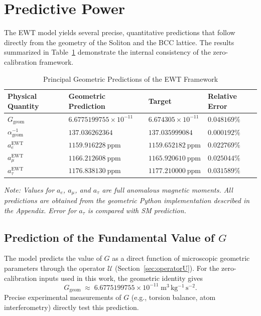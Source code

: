 \documentclass[10pt,a4paper]{article}
\begin{document}
\section{Predictive Power}
\label{sec:predictive_power}

The EWT model yields several precise, quantitative predictions that follow directly from the geometry of the Soliton and the BCC lattice. The results summarized in Table~\ref{tab:predictive_power_geom} demonstrate the internal consistency of the zero-calibration framework.

\begin{table}[ht]
	\centering
	\caption{Principal Geometric Predictions of the EWT Framework}
	\label{tab:predictive_power_geom}
	\begin{tabularx}{\textwidth}{lXXX}
		\toprule
		\textbf{Physical Quantity} & \textbf{Geometric Prediction} & \textbf{Target} & \textbf{Relative Error} \\
		\midrule
		$G_{\text{geom}}$ & $6.6775199755 \times 10^{-11}$ & $6.674305 \times 10^{-11}$ & $0.048169\%$ \\
		$\alpha_{\text{geom}}^{-1}$ & $137.036262364$ & $137.035999084$ & $0.000192\%$ \\
		\midrule
		$a_e^{\text{EWT}}$ & $1159.916228\ \text{ppm}$ & $1159.652182\ \text{ppm}$ & $0.022769\%$ \\
		$a_\mu^{\text{EWT}}$ & $1166.212608\ \text{ppm}$ & $1165.920610\ \text{ppm}$ & $0.025044\%$ \\
		$a_\tau^{\text{EWT}}$ & $1176.838130\ \text{ppm}$ & $1177.210000\ \text{ppm}$ & $0.031589\%$ \\
		\bottomrule
	\end{tabularx}
	\begin{flushleft}
		\small \textit{Note: Values for \(a_e\), \(a_\mu\), and \(a_\tau\) are full anomalous magnetic moments. All predictions are obtained from the geometric Python implementation described in the Appendix. Error for \(a_\tau\) is compared with SM prediction.}
	\end{flushleft}
\end{table}

\subsection{Prediction of the Fundamental Value of \(G\)}
\label{sec:g_predictions_pp}

The model predicts the value of \(G\) as a direct function of microscopic geometric parameters through the operator \(\mathcal{U}\) (Section~\ref{sec:operatorU}). For the zero-calibration inputs used in this work, the geometric identity gives
\begin{equation}
	G_{\text{geom}}
	\;\approx\;
	6.6775199755 \times 10^{-11}
	\;\mathrm{m^3\,kg^{-1}\,s^{-2}}.
\end{equation}
Precise experimental measurements of \(G\) (e.g., torsion balance, atom interferometry) directly test this prediction.
\end{document}
